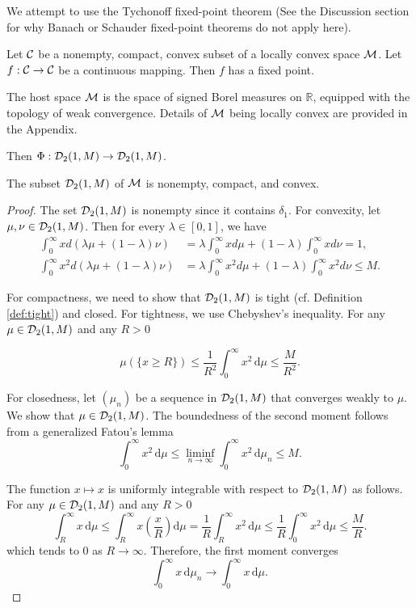 We attempt to use the Tychonoff fixed-point theorem (See the Discussion section for why Banach or Schauder fixed-point theorems do not apply here).


\begin{theorem}
  Let $\mathcal{C}$ be a nonempty, compact, convex subset of a locally convex space $\mathcal{M}$. Let $f: \mathcal{C} \to \mathcal{C}$ be a continuous mapping. Then $f$ has a fixed point.
\end{theorem}

The host space $\mathcal{M}$ is the space of signed Borel measures on $\mathbb{R}$, equipped with the topology of weak convergence. Details of $\mathcal{M}$ being locally convex are provided in the Appendix.


Then $\Phi: \mathcal{D}_2(1, M) \to \mathcal{D}_2(1, M)$.

\begin{lemma}
  \label{lem:subset-compactness}
  The subset $\mathcal{D}_2(1, M)$ of $\mathcal{M}$ is nonempty, compact, and convex.
\end{lemma}
\begin{proof}
  The set $\mathcal{D}_2(1, M)$ is nonempty since it contains $\delta_1$. For convexity, let $\mu, \nu \in \mathcal{D}_2(1, M)$. Then for every $\lambda \in [0,1]$, we have
  \begin{align*}
    \int_0^\infty x d(\lambda \mu + (1-\lambda)\nu)
     & = \lambda \int_0^\infty x d\mu + (1-\lambda) \int_0^\infty x d\nu = 1,       \\
    \int_0^\infty x^2 d(\lambda \mu + (1-\lambda)\nu)
     & = \lambda \int_0^\infty x^2 d\mu + (1-\lambda) \int_0^\infty x^2 d\nu \le M.
  \end{align*}

  For compactness, we need to show that $\mathcal{D}_2(1, M)$ is tight (cf. Definition \ref{def:tight}) and closed. For tightness, we use Chebyshev's inequality. For any $\mu \in \mathcal{D}_2(1, M)$ and any $R > 0$

  \begin{equation}
    \label{ineq:markov}
    \mu(\{x \ge R\}) \le \dfrac{1}{R^2}\int_{0}^\infty x^2 \,\mathrm{d}\mu \le \dfrac{M}{R^2}.
  \end{equation}

  For closedness, let $(\mu_n)$ be a sequence in $\mathcal{D}_2(1, M)$ that converges weakly to $\mu$. We show that $\mu \in \mathcal{D}_2(1, M)$. The boundedness of the second moment follows from a generalized Fatou's lemma \cite[Theorem 1.1]{feinberg2014fatou}
  $$\int_0^\infty x^2 \,\mathrm{d}\mu \le \liminf_{n \to \infty} \int_0^\infty x^2 \,\mathrm{d}\mu_n \le M.$$

  The function $x\mapsto x$ is uniformly integrable with respect to $\mathcal{D}_2(1, M)$ as follows. For any $\mu \in \mathcal{D}_2(1, M)$ and any $R > 0$
  $$\int_{R}^\infty x \,\mathrm{d}\mu \le \int_{R}^\infty x \left(\frac{x}{R} \right) \mathrm{d}\mu = \frac{1}{R} \int_{R}^\infty x^2 \,\mathrm{d}\mu \le \frac{1}{R} \int_{0}^\infty x^2 \,\mathrm{d}\mu \le \frac{M}{R}.$$
  which tends to 0 as $R \to \infty$. Therefore, the first moment converges \cite[Theorem 3.5]{billingsley1999convergence}
  $$\int_0^\infty x \,\mathrm{d}\mu_n \to \int_0^\infty x \,\mathrm{d}\mu.$$
\end{proof}

